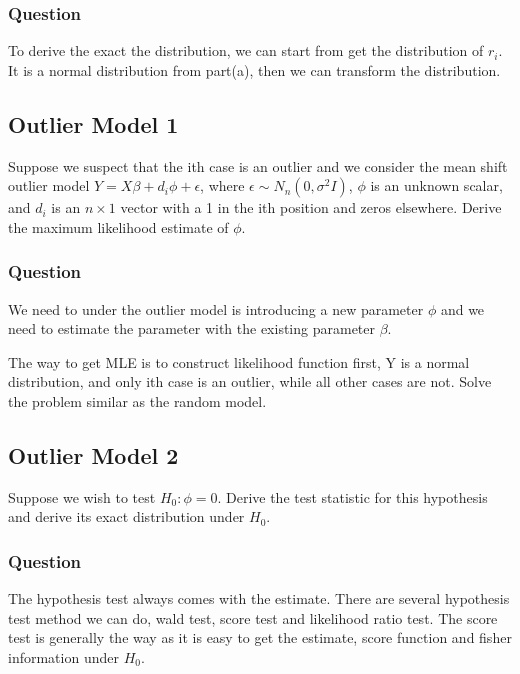 \documentclass[11pt]{article} %
\begin{document}
\subsubsection{Question}
To derive the exact the distribution, we can start from get the distribution of $r_i$. It is a normal distribution from part(a), then we can transform the distribution.


\subsection{Outlier Model 1}
Suppose we suspect that the ith case is an outlier and we consider the mean shift outlier model
$Y= X \beta + d_i \phi + \epsilon$, where $\epsilon \sim N_n(0, \sigma^2 I)$, $\phi$ is an unknown scalar, and $d_i$ is an $n \times 1$ vector with a 1 in the ith position and zeros elsewhere.
Derive the maximum likelihood estimate of $\phi$.

\subsubsection{Question}
We need to under the outlier model is introducing a new parameter $\phi$ and we need to estimate the parameter with the existing parameter $\beta$.

The way to get MLE is to construct likelihood function first, Y is a normal distribution, and only ith case is an outlier, while all other cases are not. Solve the problem similar as the random model.




\subsection{Outlier Model 2}
Suppose we wish to test $H_0 : \phi = 0$. Derive the test statistic for this hypothesis and derive its exact distribution under $H_0$.

\subsubsection{Question}

The hypothesis test always comes with the estimate. There are several hypothesis test method we can do, wald test, score test and likelihood ratio test. The score test is generally the way as it is easy to get the estimate, score function and fisher information under $H_0$.
\end{document}
